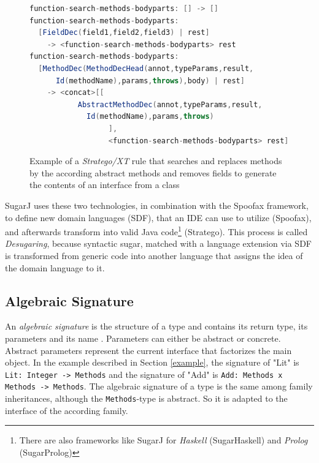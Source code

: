 \documentclass{report}
\begin{document}
\begin{figure}[H]
\begin{lstlisting}[language=java,breaklines=false,morekeywords={field1,field2,field3,annot,typeParams,result,methodName,params,throws,body,rest},keywordstyle=\bfseries\color{OliveGreen}]
function-search-methods-bodyparts: [] -> []
function-search-methods-bodyparts:
  [FieldDec(field1,field2,field3) | rest]
    -> <function-search-methods-bodyparts> rest
function-search-methods-bodyparts:
  [MethodDec(MethodDecHead(annot,typeParams,result,
      Id(methodName),params,throws),body) | rest]
    -> <concat>[[
		   AbstractMethodDec(annot,typeParams,result,
		     Id(methodName),params,throws)
		          ],
		          <function-search-methods-bodyparts> rest]
\end{lstlisting}
\caption{Example of a \emph{Stratego/XT} rule that searches and replaces methods by the according abstract methods and removes fields to generate the contents of an interface from a class}
\label{exampleStrategoClassInterfaceTranslation}
\end{figure}


SugarJ uses these two technologies, in combination with the Spoofax framework, to define new domain languages (SDF), that an IDE can use to utilize (Spoofax), and afterwards transform into valid Java code\footnote{There are also frameworks like SugarJ for \emph{Haskell} (SugarHaskell) and \emph{Prolog} (SugarProlog)} (Stratego). This process is called \emph{Desugaring}, because syntactic sugar, matched with a language extension via SDF is transformed from generic code into another language that assigns the idea of the domain language to it.


\subsection{Algebraic Signature}

\label{albegraicSignature}

An \emph{algebraic signature} is the structure of a type and contains its return type, its parameters and its name \cite{Oliv-Extensibility-2012}. Parameters can either be abstract or concrete. Abstract parameters represent the current interface that factorizes the main object. In the example described in Section \ref{example}, the signature of "Lit" is \lstinline{Lit: Integer -> Methods} and the signature of "Add" is \lstinline{Add: Methods x Methods -> Methods}. The algebraic signature of a type is the same among family inheritances, although the \lstinline{Methods}-type is abstract. So it is adapted to the interface of the according family.
\end{document}
